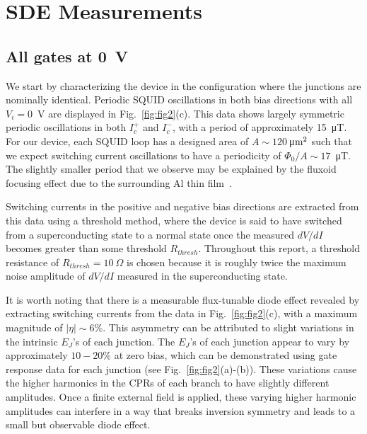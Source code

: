 \documentclass[%
 reprint,
 amsmath,amssymb,
 aps,
]{revtex4-2}
\begin{document}
\section{SDE Measurements}
\subsection{All gates at 0~V}
We start by characterizing the device in the configuration where the junctions are nominally identical. Periodic SQUID oscillations in both bias directions with all $V_i=0$~V are displayed in Fig.~\ref{fig:fig2}(c). This data shows largely symmetric periodic oscillations in both $I_c^+$ and $I_c^-$, with a period of approximately 15~μT. For our device, each SQUID loop has a designed area of $A\sim120~$μ$\textnormal{m}^2$ such that we expect switching current oscillations to have a periodicity of $\Phi_0/A\sim17$~μT. The slightly smaller period that we observe may be explained by the fluxoid focusing effect due to the surrounding Al thin film~\cite{FluxFocus2021}.

Switching currents in the positive and negative bias directions are extracted from this data using a threshold method, where the device is said to have switched from a superconducting state to a normal state once the measured $dV/dI$ becomes greater than some threshold $R_{thresh}$. Throughout this report, a threshold resistance of $R_{thresh}=10~\Omega$ is chosen because it is roughly twice the maximum noise amplitude of $dV/dI$ measured in the superconducting state. 

It is worth noting that there is a measurable flux-tunable diode effect revealed by extracting switching currents from the data in Fig.~\ref{fig:fig2}(c), with a maximum magnitude of $|\eta| \sim 6\%$. This asymmetry can be attributed to slight variations in the intrinsic $E_J$'s of each junction. The $E_J$'s of each junction appear to vary by approximately $10-20\%$ at zero bias, which can be demonstrated using gate response data for each junction (see Fig.~\ref{fig:fig2}(a)-(b)). These variations cause the higher harmonics in the CPRs of each branch to have slightly different amplitudes. Once a finite external field is applied, these varying higher harmonic amplitudes can interfere in a way that breaks inversion symmetry and leads to a small but observable diode effect.
\end{document}
